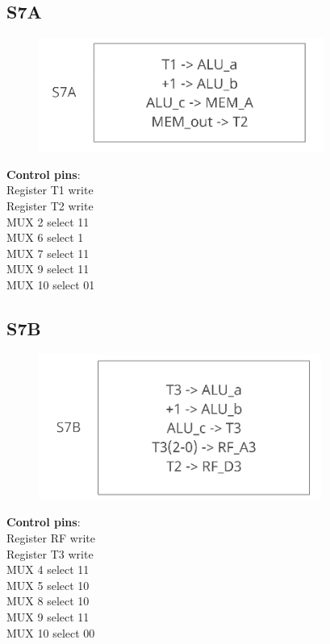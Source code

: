 \documentclass[11pt, fleqn]{article}
\begin{document}
\bigskip

\subsection*{\centering S7A}
\begin{figure}[H]
    \centering
    \includegraphics{DataPath/DataPath_S7A.PNG}
\end{figure}
\begin{center}
\textbf{Control pins}: \\
Register T1 write \\
Register T2 write \\
MUX 2 select 11 \\
MUX 6 select 1 \\
MUX 7 select 11 \\
MUX 9 select 11 \\
MUX 10 select 01 \\
\end{center}

\bigskip

\subsection*{\centering S7B}
\begin{figure}[H]
    \centering
    \includegraphics{DataPath/DataPath_S7B.PNG}
\end{figure}
\begin{center}
\textbf{Control pins}: \\
Register RF write \\
Register T3 write \\
MUX 4 select 11 \\
MUX 5 select 10 \\
MUX 8 select 10 \\
MUX 9 select 11 \\
MUX 10 select 00 \\
\end{center}
\end{document}

